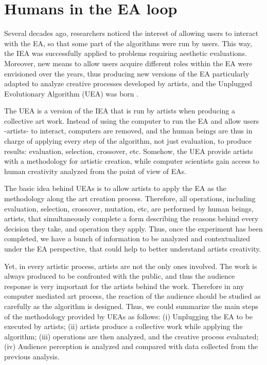 \documentclass[graybox]{svmult}
\begin{document}
\section{Humans in the EA loop}
\label{loop}
Several decades ago, researchers noticed the interest of allowing users to interact with the EA, so that some part of the algorithms were run by users.  This way, the IEA was successfully applied to problems requiring aesthetic evaluations.  Moreover, new means to allow users acquire different roles within the EA were envisioned over the years, thus producing new versions of the EA particularly adapted to analyze creative processes developed by artists, and the Unplugged Evolutionary Algorithm (UEA) was born \cite{de2013unplugging}.

The UEA is a version of the IEA that is run by artists when producing a collective art work.  Instead of using the computer to run the EA and allow users -artists- to interact, computers are removed, and the human beings are thus in charge of applying every step of the algorithm, not just evaluation, to produce results:  evaluation, selection, crossover, etc.  Somehow, the UEA provide artists with a methodology for artistic creation, while computer scientists gain access to human creativity analyzed from the point of view of EAs.

The basic idea behind UEAs is to allow artists to apply the EA as the methodology along the art creation process.  Therefore, all operations, including evaluation, selection, crossover, mutation, etc, are performed by human beings, artists, that simultaneously complete a form describing the reasons behind every decision they take, and operation they apply. Thus, once the experiment has been completed, we have a bunch of information to be analyzed and contextualized under the EA perspective, that could help to better understand artists creativity.

Yet, in every artistic process, artists are not the only ones involved.  The work is always produced to be confronted with the public, and thus the audience response is very important for the artists behind the work. Therefore in any computer mediated art process, the reaction of the audience should be studied as carefully as the algorithm is designed.  Thus, we could summarize the main steps of the methodology provided by UEAs as follows:    (i) Unplugging the EA to be executed by artists; (ii) artists produce a collective work while applying the algorithm;  (iii) operations are then analyzed, and the creative process evaluated;  (iv) Audience perception is analyzed and compared with data collected from the previous analysis.
\end{document}
